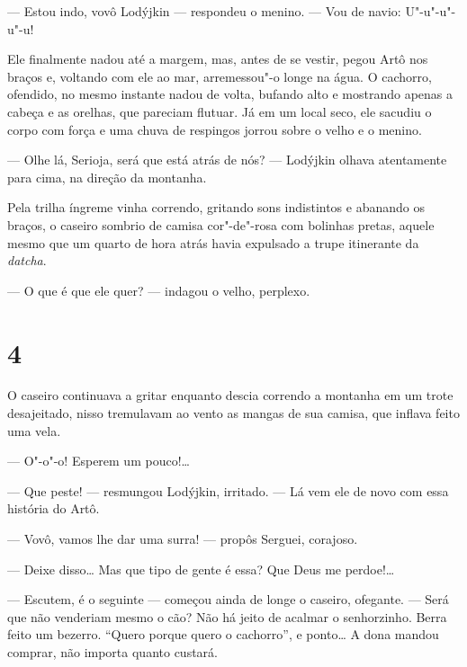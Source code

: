 --- Estou indo, vovô Lodýjkin --- respondeu o menino. --- Vou de navio:
U"-u"-u"-u"-u!

Ele finalmente nadou até a margem, mas, antes de se vestir, pegou Artô
nos braços e, voltando com ele ao mar, arremessou"-o longe na água. O
cachorro, ofendido, no mesmo instante nadou de volta, bufando alto e mostrando apenas a cabeça e
as orelhas, que pareciam flutuar. Já em um local
seco, ele sacudiu o corpo com força e uma chuva de respingos jorrou
sobre o velho e o menino.

--- Olhe lá, Serioja, será que está atrás de nós? --- Lodýjkin olhava
atentamente para cima, na direção da montanha.

Pela trilha íngreme vinha correndo, gritando sons indistintos e abanando
os braços, o caseiro sombrio de camisa cor"-de"-rosa com bolinhas pretas,
aquele mesmo que um quarto de hora atrás havia expulsado a trupe
itinerante da \emph{datcha}.

--- O que é que ele quer? --- indagou o velho, perplexo.

\section{4}

O caseiro continuava a gritar enquanto descia correndo a montanha em um
trote desajeitado, nisso tremulavam ao vento as mangas de sua camisa,
que inflava feito uma vela.

--- O"-o"-o! Esperem um pouco!\ldots{}

--- Que peste! --- resmungou Lodýjkin, irritado. --- Lá vem ele de novo
com essa história do Artô.

--- Vovô, vamos lhe dar uma surra! --- propôs Serguei, corajoso.

--- Deixe disso\ldots{} Mas que tipo de gente é essa? Que Deus me perdoe!\ldots{}

--- Escutem, é o seguinte --- começou ainda de longe o caseiro,
ofegante. --- Será que não venderiam mesmo o cão? Não há jeito de
acalmar o senhorzinho. Berra feito um bezerro. ``Quero porque quero o
cachorro'', e ponto\ldots{} A dona mandou comprar, não importa quanto
custará.


